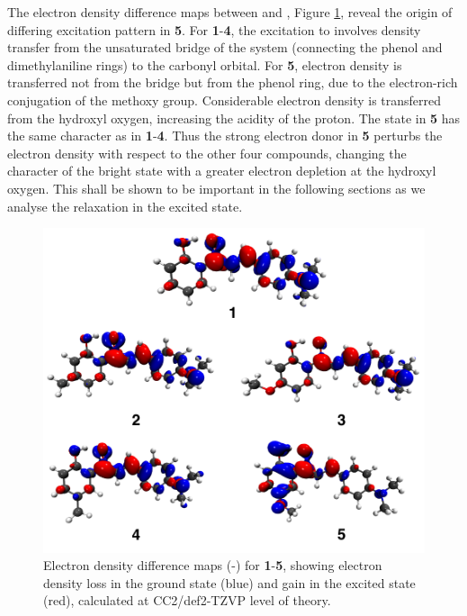 The electron density difference maps between \sone{} and \szero{}, Figure \ref{figure: HC_Vac_Densities},  reveal the origin of differing excitation pattern in \textbf{5}. For \textbf{1}-\textbf{4}, the excitation to \sone{} involves density transfer from the unsaturated bridge of the system (connecting the phenol and dimethylaniline rings) to the carbonyl \pistar{} orbital. For \textbf{5}, electron density is transferred not from the bridge but from the phenol ring, due to the electron-rich conjugation of the methoxy group. Considerable electron density is transferred from the hydroxyl oxygen, increasing the acidity of the proton. The \stwo{} state in \textbf{5} has the same character as \sone{} in \textbf{1}-\textbf{4}. Thus the strong electron donor in \textbf{5} perturbs the electron density with respect to the other four compounds, changing the character of the bright state with a greater electron depletion at the hydroxyl oxygen. This shall be shown to be important in the following sections as we analyse the relaxation in the excited state.
\begin{figure}[t]
\centering
  \includegraphics[width=0.8\linewidth]{3nonradiativedecay/HC_Vac_Densities.pdf}
  \caption[Electron density difference maps]{Electron density difference maps (\sone{}-\szero{}) for \textbf{1}-\textbf{5}, showing electron density loss in the ground state (blue) and gain in the excited state (red), calculated at CC2/def2-TZVP level of theory.}
  \label{figure: HC_Vac_Densities}
\end{figure}

